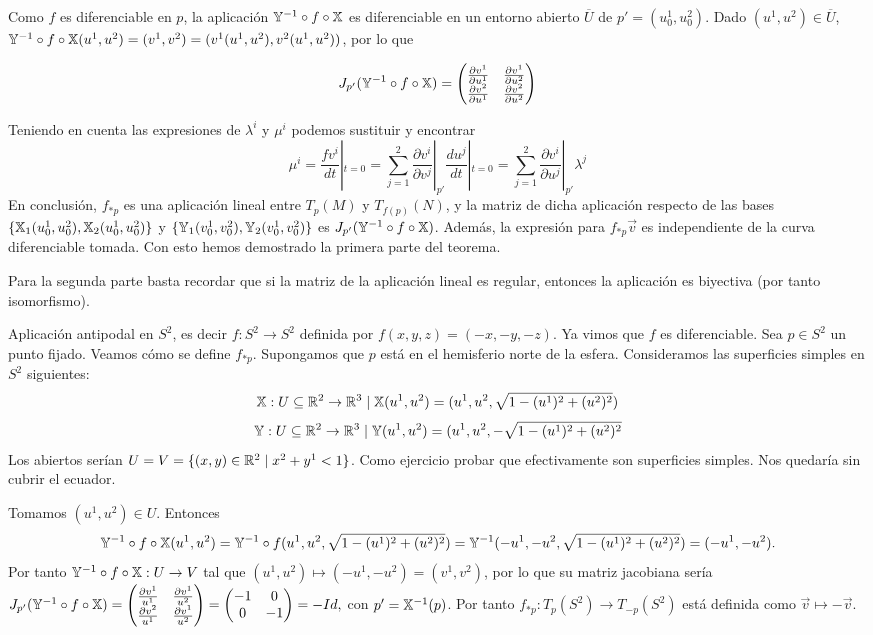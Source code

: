 \documentclass[GAP.tex]{subfiles}
\begin{document}
\begin{dem}[Teorema 17]
Como $f$ es diferenciable en $p$, la aplicación $\mathbb{Y}^{-1}\circ f\circ\mathbb{X}$ es diferenciable en un entorno abierto $\overline{U}$ de $p'=(u^1_0,u^2_0)$. Dado $(u^1,u^2)\in\overline{U}$, $\mathbb{Y}^{-1}\circ f\circ\mathbb{X}(u^1,u^2)=(v^1,v^2)=(v^1(u^1,u^2),v^2(u^1,u^2))$, por lo que

$$J_{p'}(\mathbb{Y}^{-1}\circ f\circ\mathbb{X})=\begin{pmatrix}
\frac{\partial v^1}{\partial u^1} & \frac{\partial v^1}{\partial u^2}\\
\frac{\partial v^2}{\partial u^1} & \frac{\partial v^2}{\partial u^2}
\end{pmatrix}$$

Teniendo en cuenta las expresiones de $\lambda^i$ y $\mu^i$ podemos sustituir y encontrar
$$\mu^i=\frac{fv^i}{dt}|_{t=0}=\sum_{j=1}^2\frac{\partial v^i}{\partial v^j}|_{p'}\frac{du^j}{dt}|_{t=0}=\sum_{j=1}^2\frac{\partial v^i}{\partial u^j}|_{p'}\lambda^j$$
En conclusión, $f_{*p}$ es una aplicación lineal entre $T_p(M)$ y $T_{f(p)}(N)$, y la matriz de dicha aplicación respecto de las bases $\{\mathbb{X}_1(u^1_0,u^2_0),\mathbb{X}_2(u^1_0, u^2_0)\}$ y $\{\mathbb{Y}_1(v^1_0,v^2_0),\mathbb{Y}_2(v^1_0,v^2_0)\}$ es $J_{p'}(\mathbb{Y}^{-1}\circ f\circ\mathbb{X})$. Además, la expresión para $f_{*p}\vec{v}$ es independiente de la curva diferenciable tomada. Con esto hemos demostrado la primera parte del teorema.

Para la segunda parte basta recordar que si la matriz de la aplicación lineal es regular, entonces la aplicación es biyectiva (por tanto isomorfismo). \QED

\end{dem}

\begin{ej}
Aplicación antipodal en $S^2$, es decir $f:S^2\to S^2$ definida por $f(x,y,z)=(-x,-y,-z)$. Ya vimos que $f$ es diferenciable. Sea $p\in S^2$ un punto fijado. Veamos cómo se define $f_{*p}$. Supongamos que $p$ está en el hemisferio norte de la esfera. Consideramos las superficies simples en $S^2$ siguientes:
$$\mathbb{X}:U\subseteq\mathbb{R}^2\to\mathbb{R}^3\mid \mathbb{X}(u^1,u^2)=(u^1,u^2,\sqrt{1-(u^1)^2+(u^2)^2})$$ 
$$\mathbb{Y}:U\subseteq\mathbb{R}^2\to\mathbb{R}^3\mid \mathbb{Y}(u^1,u^2)=(u^1,u^2,-\sqrt{1-(u^1)^2+(u^2)^2}$$
Los abiertos serían $U=V=\{(x,y)\in\mathbb{R}^2\mid x^2+y^1<1\}$. Como ejercicio probar que efectivamente son superficies simples. Nos quedaría sin cubrir el ecuador.

Tomamos $(u^1,u^2)\in U$. Entonces $$\mathbb{Y}^{-1}\circ f\circ \mathbb{X}(u^1,u^2)=\mathbb{Y}^{-1}\circ f(u^1,u^2,\sqrt{1-(u^1)^2+(u^2)^2})=\mathbb{Y}^{-1}(-u^1,-u^2,\sqrt{1-(u^1)^2+(u^2)^2})=(-u^1,-u^2).$$
Por tanto $\mathbb{Y}^{-1}\circ f\circ \mathbb{X}:U\to V$ tal que $(u^1,u^2)\mapsto (-u^1,-u^2)=(v^1,v^2)$, por lo que su matriz jacobiana sería
$J_{p'}(\mathbb{Y}^{-1}\circ f\circ \mathbb{X})=\begin{pmatrix}
\frac{\partial v^1}{u^1}	& \frac{\partial v^1}{u^2}\\
\frac{\partial v^2}{u^1}	& \frac{\partial v^1}{u^2}
\end{pmatrix}=\begin{pmatrix}
-1	& 0\\
0	& -1
\end{pmatrix}=-Id,$ con $p'=\mathbb{X}^{-1}(p)$. Por tanto $f_{*p}:T_p(S^2)\to T_{-p}(S^2)$ está definida como $\vec{v}\mapsto -\vec{v}$.
\end{ej}
\end{document}
